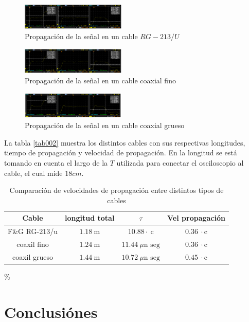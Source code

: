 \documentclass[a4paper,10pt]{article}
\begin{document}
		\begin{figure}[!htb]
			\centering
			\includegraphics[width=5cm]
			{Imagenes/CableF&G.png}
			\caption{Propagación de la señal en un cable $RG-213/U$}
			\label{img010}
		\end{figure}
		\begin{figure}[!htb]
			\centering
			\includegraphics[width=5cm]
			{Imagenes/CableCoaxialFino.png}
			\caption{Propagación de la señal en un cable coaxial fino}
			\label{img011}
		\end{figure}
		\begin{figure}[!htb]
			\centering
			\includegraphics[width=5cm]
			{Imagenes/CableCoaxialGrueso.png}
			\caption{Propagación de la señal en un cable coaxial grueso}
			\label{img012}
		\end{figure}

	\indent La tabla \ref{tab002} muestra los distintos cables con sus 
	respectivas longitudes, tiempo de propagación y velocidad de propagación. En
	la longitud se está tomando en cuenta el largo de la $T$ utilizada para 
	conectar el osciloscopio al cable, el cual mide $18 cm$. \\
	
	\begin{table}[!htp]
		\centering
		\begin{tabular}{|c|c|c|c|}
			\hline
    		Cable & longitud total & $\tau$ & Vel propagación \\
			\hline
			F\&G RG-213/u & $1.18~\text{m}$ & $10.88\cdot~\text{c}$ & 
			$0.36~\cdot\text{c}$ \\
			\hline 
			coaxil fino & $1.24~\text{m}$ & $11.44~\mu\text{n seg}$ &
			$0.36~\cdot\text{c}$ \\
			\hline
			coaxil grueso & $1.44~\text{m}$ & $10.72~\mu\text{n seg}$ & 
			$0.45~\cdot\text{c}$ \\
			\hline
		\end{tabular}
		\caption{Comparación de velocidades de propagación entre distintos 
		tipos de cables} \label{tab001}
	\end{table}

	\% 
	\newpage 
	\section{Conclusiónes}
\end{document}
